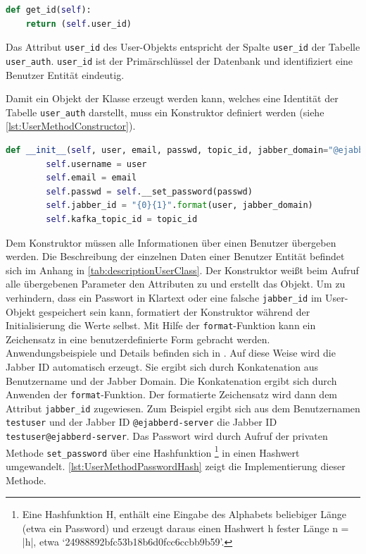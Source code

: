 \documentclass[a4paper,titlepage,halfparskip,12pt]{scrreprt}
\begin{document}
\begin{onehalfspacing}
\bigskip

\begin{lstlisting}[language=python, caption={Methode zur Identifizerung des Benutzers für das flask\_login Modul}, label={lst:UserMethodFlaskLogin}]
def get_id(self):
    return (self.user_id)
\end{lstlisting}

Das Attribut \texttt{user\_id} des User-Objekts entspricht der Spalte \texttt{user\_id} der Tabelle \texttt{user\_auth}. \texttt{user\_id} ist der Primärschlüssel der Datenbank und identifiziert eine Benutzer Entität eindeutig.

Damit ein Objekt der Klasse erzeugt werden kann, welches eine Identität der Tabelle \texttt{user\_auth} darstellt, muss ein Konstruktor definiert werden (siehe \autoref{lst:UserMethodConstructor}).

\bigskip

\begin{lstlisting}[language=python, caption={Konstruktor der Klasse User}, label={lst:UserMethodConstructor}]
    def __init__(self, user, email, passwd, topic_id, jabber_domain="@ejabberd-server"):
        self.username = user
        self.email = email
        self.passwd = self.__set_password(passwd)
        self.jabber_id = "{0}{1}".format(user, jabber_domain)
        self.kafka_topic_id = topic_id
\end{lstlisting}

Dem Konstruktor müssen alle Informationen über einen Benutzer übergeben werden. Die Beschreibung der einzelnen Daten einer Benutzer Entität befindet sich im Anhang in \autoref{tab:descriptionUserClass}. Der Konstruktor weißt beim Aufruf alle übergebenen Parameter den Attributen zu und erstellt das Objekt. Um zu verhindern, dass ein Passwort in Klartext oder eine falsche \texttt{jabber\_id} im User-Objekt gespeichert sein kann, formatiert der Konstruktor während der Initialisierung die Werte selbst. Mit Hilfe der \texttt{format}-Funktion kann ein Zeichensatz in eine benutzerdefinierte Form gebracht werden. Anwendungsbeispiele und Details befinden sich in \cite{pythonFormat}. Auf diese Weise wird die Jabber ID automatisch erzeugt. Sie ergibt sich durch Konkatenation aus Benutzername und der Jabber Domain. Die Konkatenation ergibt sich durch Anwenden der \texttt{format}-Funktion. Der formatierte Zeichensatz wird dann dem Attribut \texttt{jabber\_id} zugewiesen. Zum Beispiel ergibt sich aus dem Benutzernamen \texttt{testuser} und der Jabber ID \texttt{@ejabberd-server} die Jabber ID \texttt{testuser@ejabberd-server}. Das Passwort wird durch Aufruf der privaten Methode \texttt{set\_password} über eine Hashfunktion \footnote{Eine Hashfunktion H, enthält eine Eingabe des Alphabets beliebiger Länge (etwa ein Password) und erzeugt daraus einen Hashwert h fester Länge n = |h|, etwa ‘24988892bfc53b18b6d0fcc6ccbb9b59’.\cite{wendzel2018}} in einen Hashwert umgewandelt. \autoref{lst:UserMethodPasswordHash} zeigt die Implementierung dieser Methode.


\end{onehalfspacing}
\end{document}
